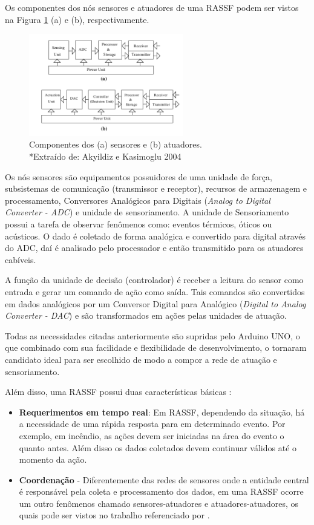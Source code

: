 \documentclass[12pt,a4paper,oneside]{report}
\begin{document}
Os componentes dos nós sensores e atuadores de uma RASSF podem ser vistos na Figura \ref{fig:componentes-atuador-sensor} (a) e (b), respectivamente.

\begin{figure}[htbp]
   \centering
    \includegraphics[width=0.6\textwidth]{figuras/figura_2_7}
    \caption{Componentes dos (a) sensores e (b) atuadores.\\ *\footnotesize Extraído de: Akyildiz e Kasimoglu 2004 \cite{wsaniais}}
    \label{fig:componentes-atuador-sensor}
\end{figure}

Os nós sensores são equipamentos possuidores de uma unidade de força, subsistemas de comunicação (transmissor e receptor), recursos de armazenagem e processamento, Conversores Analógicos para Digitais (\emph{Analog to Digital Converter - ADC}) e unidade de sensoriamento. A unidade de Sensoriamento possui a tarefa de observar fenômenos como: eventos térmicos, óticos ou acústicos. O dado é coletado de forma analógica e convertido para digital através do ADC, daí é analisado pelo processador e então transmitido para os atuadores cabíveis.

A função da unidade de decisão (controlador) é receber a leitura do sensor como entrada e gerar um comando de ação como saída. Tais comandos são convertidos em dados analógicos por um Conversor Digital para Analógico (\emph{Digital to Analog Converter - DAC}) e são transformados em ações pelas unidades de atuação.

Todas as necessidades citadas anteriormente são supridas pelo Arduino UNO, o que combinado com sua facilidade e flexibilidade de desenvolvimento, o tornaram candidato ideal para ser escolhido de modo a compor a rede de atuação e sensoriamento.

Além disso, uma RASSF possui duas características básicas \cite{wsaniais}:
\begin{itemize}
    \item \textbf{Requerimentos em tempo real}: Em RASSF, dependendo da situação, há a necessidade de uma rápida resposta para em determinado evento. Por exemplo, em incêndio, as ações devem ser iniciadas na área do evento o quanto antes. Além disso os dados coletados devem continuar válidos até o momento da ação.
    \item \textbf{Coordenação} - Diferentemente das redes de sensores onde a entidade central é responsável pela coleta e processamento dos dados, em  uma RASSF ocorre um outro fenômenos chamado sensores-atuadores e atuadores-atuadores, os quais pode ser vistos no trabalho referenciado por \cite{wsaniais}.
\end{itemize}
\end{document}
